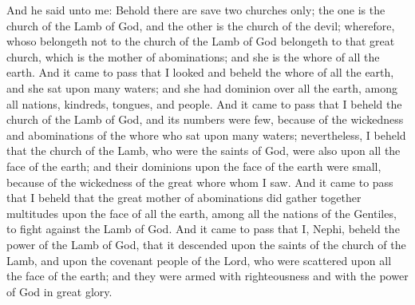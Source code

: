 And he said unto me: Behold there are save two churches only; the one is the church of the Lamb of God, and the other is the church of the devil; wherefore, whoso belongeth not to the church of the Lamb of God belongeth to that great church, which is the mother of abominations; and she is the whore of all the earth.
\bverse \iffalse And it came to pass that I looked and beheld the whore of all the earth, and she sat upon many waters; and she had dominion over all the earth, among all nations, kindreds, tongues, and people. \fi
And it came to pass that I looked and beheld the whore of all the earth, and she sat upon many waters; and she had dominion over all the earth, among all nations, kindreds, tongues, and people.
\bverse \iffalse And it came to pass that I beheld the church of the Lamb of God, and its numbers were few, because of the wickedness and abominations of the whore who sat upon many waters; nevertheless, I beheld that the church of the Lamb, who were the saints of God, were also upon all the face of the earth; and their dominions upon the face of the earth were small, because of the wickedness of the great whore whom I saw. \fi
And it came to pass that I beheld the church of the Lamb of God, and its numbers were few, because of the wickedness and abominations of the whore who sat upon many waters; nevertheless, I beheld that the church of the Lamb, who were the saints of God, were also upon all the face of the earth; and their dominions upon the face of the earth were small, because of the wickedness of the great whore whom I saw.
\bverse \iffalse And it came to pass that I beheld that the great mother of abominations did gather together multitudes upon the face of all the earth, among all the nations of the Gentiles, to fight against the Lamb of God. \fi
And it came to pass that I beheld that the great mother of abominations did gather together multitudes upon the face of all the earth, among all the nations of the Gentiles, to fight against the Lamb of God.
\bverse \iffalse And it came to pass that I, Nephi, beheld the power of the Lamb of God, that it descended upon the saints of the church of the Lamb, and upon the covenant people of the Lord, who were scattered upon all the face of the earth; and they were armed with righteousness and with the power of God in great glory. \fi
And it came to pass that I, Nephi, beheld the power of the Lamb of God, that it descended upon the saints of the church of the Lamb, and upon the covenant people of the Lord, who were scattered upon all the face of the earth; and they were armed with righteousness and with the power of God in great glory.
